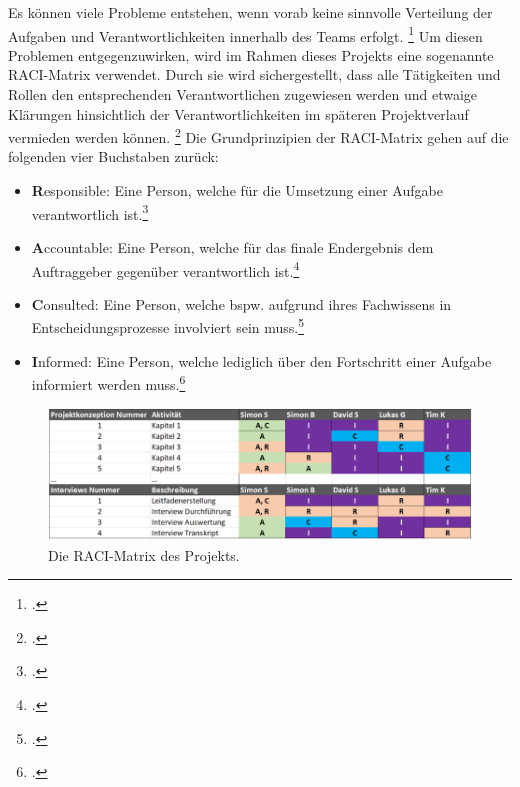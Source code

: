 Es können viele Probleme entstehen, wenn vorab keine sinnvolle Verteilung der Aufgaben und Verantwortlichkeiten innerhalb des Teams erfolgt.
\footcite[Vgl.][122]{suhandaRACIMatrixDesign2021}
Um diesen Problemen entgegenzuwirken, wird im Rahmen dieses Projekts eine sogenannte \ac{RACI}-Matrix verwendet.
Durch sie wird sichergestellt, dass alle Tätigkeiten und Rollen den entsprechenden Verantwortlichen zugewiesen werden und etwaige Klärungen hinsichtlich der Verantwortlichkeiten
im späteren Projektverlauf vermieden werden können.
\footcite[Vgl.][1]{farnettiOPTIMIZINGCOMMUNICATIONFLOWS2022}
Die Grundprinzipien der \ac{RACI}-Matrix gehen auf die folgenden vier Buchstaben zurück:
\begin{itemize}
    \item \textbf{R}esponsible: Eine Person, welche für die Umsetzung einer Aufgabe verantwortlich ist.\footcite[Vgl.][4]{farnettiOPTIMIZINGCOMMUNICATIONFLOWS2022}
    \item \textbf{A}ccountable: Eine Person, welche für das finale Endergebnis dem Auftraggeber gegenüber verantwortlich ist.\footcite[Vgl.][4]{farnettiOPTIMIZINGCOMMUNICATIONFLOWS2022}
    \item \textbf{C}onsulted: Eine Person, welche bspw. aufgrund ihres Fachwissens in Entscheidungsprozesse involviert sein muss.\footcite[Vgl.][4]{farnettiOPTIMIZINGCOMMUNICATIONFLOWS2022}
    \item \textbf{I}nformed: Eine Person, welche lediglich über den Fortschritt einer Aufgabe informiert werden muss.\footcite[Vgl.][4]{farnettiOPTIMIZINGCOMMUNICATIONFLOWS2022}
\end{itemize}
\begin{figure}[H]
    \centering
    \includegraphics[width=0.9\linewidth]{graphics/raci.png}
    \caption[Die \ac{RACI}-Matrix des Projekts.]{Die \ac{RACI}-Matrix des Projekts.}\label{abb:raci}
\end{figure}
